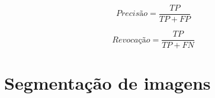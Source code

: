 \begin{equation}
  Precisão = \frac{TP}{TP+FP}
\label{eq:precisao}
\end{equation}


\begin{equation}
  Revocação = \frac{TP}{TP+FN}
\label{eq:revocacao}
\end{equation}





\section{Segmentação de imagens}

